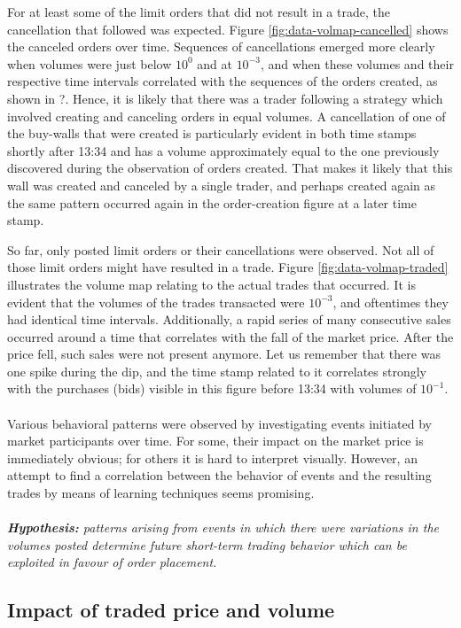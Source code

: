For at least some of the limit orders that did not result in a trade, the cancellation that followed was expected.
Figure \ref{fig:data-volmap-cancelled} shows the canceled orders over time.
Sequences of cancellations emerged more clearly when volumes were just below $10^0$ and at $10^{-3}$, and when these volumes and their respective time intervals correlated with the sequences of the orders created, as shown in ?.
Hence, it is likely that there was a trader following a strategy which involved creating and canceling orders in equal volumes.
A cancellation of one of the buy-walls that were created is particularly evident in both time stamps shortly after 13:34 and has a volume approximately equal to the one previously discovered during the observation of orders created.
That makes it likely that this wall was created and canceled by a single trader, and perhaps created again as the same pattern occurred again in the order-creation figure at a later time stamp.

So far, only posted limit orders or their cancellations were observed.
Not all of those limit orders might have resulted in a trade. Figure \ref{fig:data-volmap-traded} illustrates the volume map relating to the actual trades that occurred.
It is evident that the volumes of the trades transacted were $10^{-3}$, and oftentimes they had identical time intervals.
Additionally, a rapid series of many consecutive sales occurred around a time that correlates with the fall of the market price.
After the price fell, such sales were not present anymore.
Let us remember that there was one spike during the dip, and the time stamp related to it correlates strongly with the purchases (bids) visible in this figure before 13:34 with volumes of $10^{-1}$.
\\
\\
Various behavioral patterns were observed by investigating events initiated by market participants over time.
For some, their impact on the market price is immediately obvious; for others it is hard to interpret visually.
However, an attempt to find a correlation between the behavior of events and the resulting trades by means of learning techniques seems promising.
\\
\\
\textit{\textbf{Hypothesis:} patterns arising from events in which there were variations in the volumes posted determine future short-term trading behavior which can be exploited in favour of order placement.}

\subsection{Impact of traded price and volume}
\label{sec:data-hypthesis-trade-price-volume}

